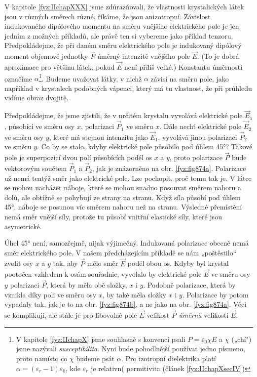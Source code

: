     V kapitole \ref{fyz:IIchapXXX} jsme zdůrazňovali, že vlastnosti krystalických látek jsou v
    různých směrech různé, říkáme, že jsou anizotropní. Závislost indukovaného dipólového momentu na
    směru vnějšího elektrického pole je jen jedním z možných příkladů, ale právě ten si vybereme
    jako příklad tenzoru. Předpokládejme, že při daném směru elektrického pole je indukovaný
    dipólový moment objemové jednotky \(\vec{P}\) úměrný intenzitě vnějšího pole \(\vec{E}\). (To je
    dobrá aproximace pro většinu látek, pokud \(\vec{E}\) není příliš velké.) Konstantu úměrnosti
    označíme \(\alpha\)\footnote{V kapitole \ref{fyz:IIchapX} jsme souhlasně s konvencí psali
    \(P=\varepsilon_0\chi E\) a \(\chi\) („chí") jsme nazývali \emph{susceptibilita}. Nyni bude
    pohodlnější používat jedno písmeno, proto namísto co \(\chi\) budeme psát \(\alpha\). Pro
    izotropní dielektrika platí \(\alpha = (\varepsilon_r - 1)\varepsilon_0\), kde \(\varepsilon_r\)
    je relativn( permitivita (článek \ref{fyz:IIchapXsecIV})}. Budeme uvažovat látky, v nichž
    \(\alpha\) závisí na směru pole, jako například v krystalech podobných vápenci, který má tu
    vlastnost, že při průhledu vidíme obraz dvojitě. 

    Předpokládejme, že jsme zjistili, že v určitém krystalu vyvolává elektrické pole \(\vec{E}_1\),
    působící ve směru osy \(x\), polarizaci \(\vec{P}_1\) ve směru \(x\). Dále nechť elektrické pole
    \(\vec{E}_2\) ve směru osy \(y\), které má stejnou intenzitu jako \(\vec{E}_1\), vyvolává jinou
    polarizaci \(\vec{P}_2\) ve směru \(y\). Co by se stalo, kdyby elektrické pole působilo pod
    úhlem \ang{45}? Takové pole je superpozicí dvou polí působících podél os \(x\) a \(y\), proto
    polarizace \(\vec{P}\) bude vektorovým součtem \(\vec{P}_1\) a \(\vec{P}_2\), jak je znázorněno
    na obr. \ref{fyz:fig874a}. Polarizace už nemá tentýž směr jako elektrické pole. Lze pochopit,
    proč tomu tak je. V látce se mohou nacházet náboje, které se mohou snadno posouvat směrem nahoru
    a dolů, ale obtížně se pohybují ze strany na stranu. Když síla působí pod úhlem \ang{45}, náboje
    se posunou víc směrem nahoru než na stranu. Výsledné přemístění nemá směr vnější síly, protože
    tu působí vnitřní elastické síly, které jsou asymetrické.
    
    Úhel \ang{45} není, samozřejmě, nijak výjimečný. Indukovaná polarizace obecně nemá směr
    elektrického pole. V našem předcházejícím příkladě se nám „poštěstilo“ zvolit osy \(x\) a \(y\)
    tak, aby \(\vec{P}\) mělo směr \(\vec{E}\) podél obou os. Kdyby byl krystal pootočen vzhledem k
    osám souřadnic, vyvolalo by elektrické pole \(\vec{E}\) ve směru osy \(y\) polarizaci
    \(\vec{P}\), která by měla obě složky, \(x\) i \(y\). Podobně polarizace, která by vznikla díky
    poli ve směru osy \(x\), by také měla složky \(x\) i \(y\). Polarizace by potom vypadaly tak,
    jak je to na obr. \ref{fyz:fig874b}, a ne jako na obr. \ref{fyz:fig874a}. Věci se komplikují,
    ale stále je pro libovolné pole \(\vec{E}\) velikost \(\vec{P}\) \emph{úměrná} velikosti
    \(\vec{E}\). 
    
